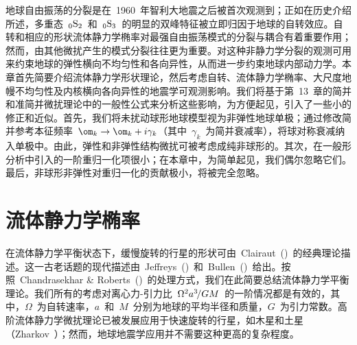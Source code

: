 地球自由振荡的分裂是在~1960~年智利大地震之后被首次观测到；正如在历史介绍所述，多重态~${}_0{\rm S}_2$~和~${}_0{\rm S}_3$~的明显的双峰特征被立即归因于地球的自转效应。自转和相应的形状流体静力学椭率对最强自由振荡模式的分裂与耦合有着重要作用；然而，由其他微扰产生的模式分裂往往更为重要。对这种非静力学分裂的观测可用来约束地球的弹性横向不均匀性和各向异性，从而进一步约束地球内部动力学。本章首先简要介绍流体静力学形状理论，然后考虑自转、流体静力学椭率、大尺度地幔不均匀性及内核横向各向异性的地震学可观测影响。我们将基于第~13~章的简并和准简并微扰理论中的一般性公式来分析这些影响，为方便起见，引入了一些小的修正和近似。首先，我们将未扰动球形地球模型视为非弹性地球单极；通过修改简并参考本征频率~$\om_k\rightarrow\om_k+i\gamma_k$（其中~$\gamma_k$~为简并衰减率），将球对称衰减纳入单极中。由此，弹性和非弹性结构微扰可被考虑成纯非球形的。其次，在一般形分析中引入的一阶重归一化项很小；在本章中，为简单起见，我们偶尔忽略它们。最后，非球形非弹性对重归一化的贡献极小，将被完全忽略。

\section{流体静力学椭率}
%
%
\label{section:shape of the earth}

在流体静力学平衡状态下，缓慢旋转的行星的形状可由~Clairaut~(\citeyear{clairaut43})~的经典理论描述。这一古老话题的现代描述由~Jeffreys~(\citeyear{jeffreys70})~和~Bullen~(\citeyear{bullen75})~给出。按照~Chandrasekhar \& Roberts~(\citeyear{chandrasekhar&roberts63})~的处理方式，我们在此简要总结流体静力学平衡理论。我们所有的考虑对离心力-引力比~$\Omega^2a^3\hspace{-0.5 mm}/GM$~的一阶情况都是有效的，其中，$\Omega$~为自转速率，$a$~和~$M$~分别为地球的平均半径和质量，$G$~为引力常数。高阶流体静力学微扰理论已被发展应用于快速旋转的行星，如木星和土星（Zharkov~\citeyear{zharkov78}）；然而，地球地震学应用并不需要这种更高的复杂程度。

